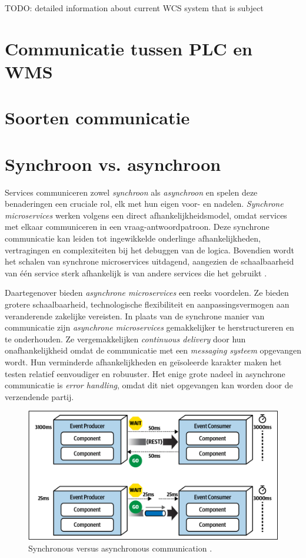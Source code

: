 TODO: detailed information about current WCS system that is subject

\section{Communicatie tussen PLC en WMS}

\section{Soorten communicatie}


\section{Synchroon vs. asynchroon}
Services communiceren zowel \emph{synchroon} als \emph{asynchroon} en spelen deze benaderingen een cruciale rol, 
elk met hun eigen voor- en nadelen. \emph{Synchrone microservices} werken volgens een direct 
afhankelijkheidsmodel, omdat services met elkaar communiceren in een vraag-antwoordpatroon. 
Deze synchrone communicatie kan leiden tot ingewikkelde onderlinge afhankelijkheden, vertragingen en complexiteiten bij het debuggen 
van de logica. Bovendien wordt het schalen van synchrone microservices uitdagend, 
aangezien de schaalbaarheid van één service sterk afhankelijk is van andere services die het gebruikt \autocite{Bellemare2020}. 
\newline

Daartegenover bieden \emph{asynchrone microservices} een reeks voordelen. Ze bieden grotere schaalbaarheid, technologische 
flexibiliteit en aanpassingsvermogen aan veranderende zakelijke vereisten. 
In plaats van de synchrone manier van communicatie zijn \emph{asynchrone microservices} 
gemakkelijker te herstructureren en te onderhouden. 
Ze vergemakkelijken \emph{continuous delivery} door hun onafhankelijkheid omdat de communicatie 
met een \emph{messaging systeem} opgevangen wordt. Hun verminderde afhankelijkheden en 
geïsoleerde karakter maken het testen relatief eenvoudiger en robuuster.
Het enige grote nadeel in asynchrone communicatie is \emph{error handling}, 
omdat dit niet opgevangen kan worden door de verzendende partij.
\newline

\begin{figure}[H]
  \centering
  \includegraphics[width=.5\textwidth]{../voorstel/img/synchronous_vs_async_calls.png}
  \caption{\label{fig:img}Synchronous versus asynchronous communication \autocite[figure 14 -- 13]{MarkRichards2021}.}
\end{figure}

